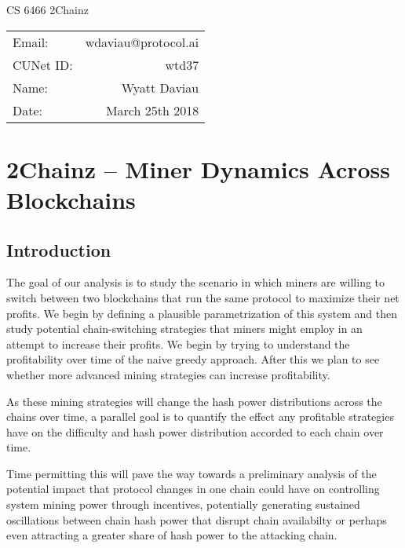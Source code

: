 \documentclass[12pt]{article}
\begin{document}
\begin{center}
{\Large CS 6466 2Chainz}


\begin{tabular}{lr}
Email: & wdaviau@protocol.ai \\
CUNet ID: & wtd37 \\
Name: & Wyatt Daviau \\
Date: & March 25th 2018 \\
\end{tabular}
\end{center}



\section*{2Chainz -- Miner Dynamics Across Blockchains}

\subsection*{Introduction}
The goal of our analysis is to study the scenario in which miners are willing to switch between two blockchains that run the same protocol to maximize their net profits.  We begin by defining a plausible parametrization of this system and then study potential chain-switching strategies that miners might employ in an attempt to increase their profits.  We begin by trying to understand the profitability over time of the naive greedy approach.  After this we plan to see whether more advanced mining strategies can increase profitability.  

As these mining strategies will change the hash power distributions across the chains over time, a parallel goal is to quantify the effect any profitable strategies have on the difficulty and hash power distribution accorded to each chain over time.

Time permitting this will pave the way towards a preliminary analysis of the potential impact that protocol changes in one chain could have on controlling system mining power through incentives, potentially generating sustained oscillations between chain hash power that disrupt chain availabilty or perhaps even attracting a greater share of hash power to the attacking chain.
\end{document}

